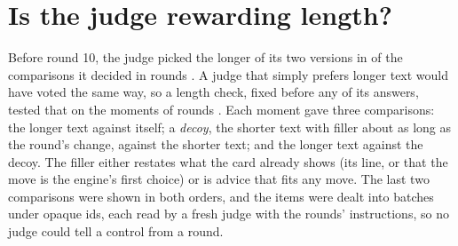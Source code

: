 \documentclass[11pt]{article}
\begin{document}
\begin{table}[!htbp]
\centering\footnotesize
\JudgeTable
\caption{The judge rounds, pooled over both runs: new--old preferred, with the same-answers in
parentheses. Round 6 made no run of its own: it reads round 5's judgments on the moments whose
texts round 6 changes. Round 17's judges read a seeded sample of the moments it changed; round 17b
judged again the sampled moments whose wording it changed, and round 17 is decided on both. Rounds
19, 20b, 21, 22, 23, 24, 25, 26 and 29 were judged on seeded samples too, round 21's, round 22's,
round 23's, round 24's, round 25's, round 26's and round 29's taking every moment they changed;
round 22b judged every moment round 22 changed again, on its final wording, and round 22 is decided
on both, as round 17 is. Round 20's first version was not judged.}
\label{tab:judge}
\end{table}

\section{Is the judge rewarding length?}
\label{sec:length}

Before round 10, the judge picked the longer of its two versions in \LongerPicked{} of the
\LongerDecided{} comparisons it decided in rounds \LongerRounds. A judge that simply prefers
longer text would have voted the same way, so a length check, fixed before any of its answers,
tested that on the moments of rounds \LengthRounds. Each moment gave three comparisons: the
longer text against itself; a \emph{decoy}, the shorter text with filler about as long as the
round's change, against the shorter text; and the longer text against the decoy. The filler
either restates what the card already shows (its line, or that the move is the engine's first
choice) or is advice that fits any move. The last two comparisons were shown in both orders, and
the \LengthItems{} items were dealt into \LengthBatches{} batches under opaque ids, each read by
a fresh judge with the rounds' instructions, so no judge could tell a control from a round.
\end{document}
